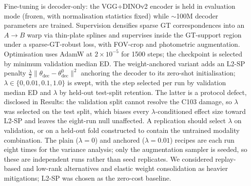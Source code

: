 \documentclass[fleqn,10pt]{wlscirep}
\begin{document}
Fine-tuning is decoder-only: the VGG+DINOv2 encoder is held in evaluation mode (frozen, with normalisation statistics fixed) while $\sim$100M decoder parameters are trained. Supervision densifies sparse GT correspondences into an $A\rightarrow B$ warp via thin-plate splines and supervises inside the GT-support region under a sparse-GT-robust loss, with FOV-crop and photometric augmentation. Optimisation uses AdamW at $2\times10^{-5}$ for 1500 steps; the checkpoint is selected by minimum validation median ED. The weight-anchored variant adds an L2-SP penalty\cite{li2018l2sp} $\tfrac{\lambda}{2}\lVert\theta_{\mathrm{dec}}-\theta_{\mathrm{dec}}^{0}\rVert^{2}$ anchoring the decoder to its zero-shot initialisation; $\lambda\in\{0,0.01,0.1,1.0\}$ is swept, with the step selected per run by validation median ED and $\lambda$ by held-out test-split retention. The latter is a protocol defect, disclosed in Results: the validation split cannot resolve the C103 damage, so $\lambda$ was selected on the test split, which biases every $\lambda$-conditioned effect size toward L2-SP and leaves the eight-run null unaffected. A replication should select $\lambda$ on validation, or on a held-out fold constructed to contain the untrained modality combination. The plain ($\lambda=0$) and anchored ($\lambda=0.01$) recipes are each run eight times for the variance analysis; only the augmentation sampler is seeded, so these are independent runs rather than seed replicates. We considered replay-based and low-rank\cite{hu2022lora} alternatives and elastic weight consolidation\cite{kirkpatrick2017ewc} as heavier mitigations; L2-SP was chosen as the zero-cost baseline.
\end{document}
